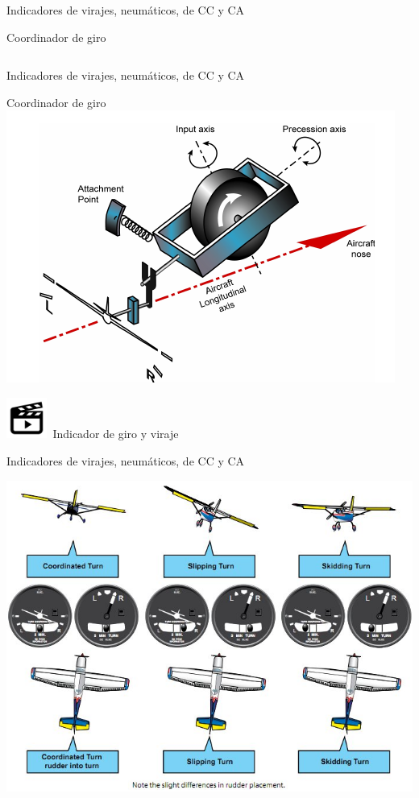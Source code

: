 \begin{frame}{Indicadores de virajes, neum\'aticos, de CC y CA}
\begin{block}{Coordinador de giro}
\begin{columns}
    \end{columns}

  \end{block}

\end{frame}



\begin{frame}{Indicadores de virajes, neum\'aticos, de CC y CA}
  \begin{block}{Coordinador de giro} \centering
       \includegraphics[width=0.65\linewidth]{05.instrumentos.giroscopicos.imagenes/05.02.indicadores.viraje.imagenes/coordinador_viraje_02.png}
     \end{block}

 {\tiny
\href{https://www.youtube.com/watch?v=a4iLtZPp_-8}{\includegraphics[width=0.1\textwidth]{05.IyA.imagenes/Video.png}}\, Indicador de giro y viraje
 }
\end{frame}
      
\begin{frame}{Indicadores de virajes, neum\'aticos, de CC y CA}

       \includegraphics[width=0.75\linewidth]{05.instrumentos.giroscopicos.imagenes/05.02.indicadores.viraje.imagenes/slipping_skidding.jpg}
\end{frame}

